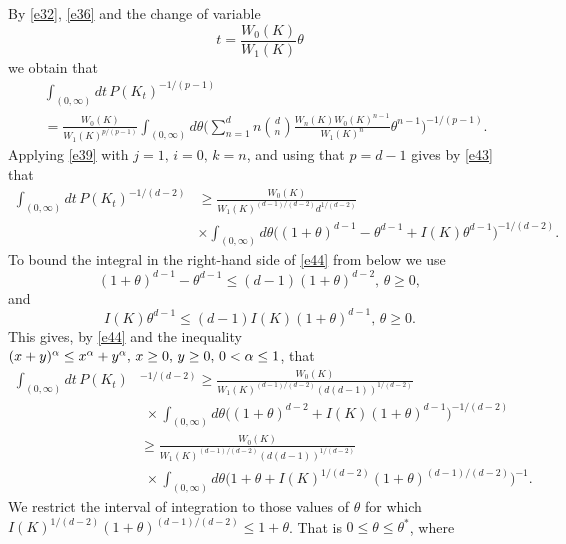 \documentclass[a4paper,9pt]{article}
\begin{document}
\medskip


 By \eqref{e32}, \eqref{e36} and the change of variable
\begin{equation*}%
t=\frac{W_0(K)}{W_1(K)}\theta
\end{equation*}
we obtain that
\begin{align}\label{e43}
&\int_{(0,\infty)}dt\, P(K_t)^{-1/(p-1)}\nonumber\\&=\frac{W_0(K)}{W_1(K)^{p/(p-1)}}\int_{(0,\infty)}d\theta \Big(\sum_{n=1}^d n\binom{d}{n} \frac{W_n(K)W_0(K)^{n-1}}{W_1(K)^n}\theta^{n-1}\Big)^{-1/(p-1)}.
\end{align}
Applying \eqref{e39} with $j=1,\,i=0,\,k=n$, and using that $p=d-1$ gives by \eqref{e43} that
\begin{align}\label{e44}
\int_{(0,\infty)}dt\, P(K_t)^{-1/(d-2)}&\ge\frac{W_0(K)}{W_1(K)^{(d-1)/(d-2)}d^{1/(d-2)}}\nonumber\\&\times\int_{(0,\infty)}d\theta \Big((1+\theta)^{d-1}-\theta^{d-1}+I(K)\theta^{d-1}\Big)^{-1/(d-2)}.
\end{align}
To bound the integral in the right-hand side of \eqref{e44} from below we use
\begin{equation*}%
(1+\theta)^{d-1}-\theta^{d-1}\le (d-1)(1+\theta)^{d-2},\,\theta\ge 0,
\end{equation*}
and
\begin{equation*}%
I(K)\theta^{d-1}\le (d-1)I(K)(1+\theta)^{d-1},\,\theta\ge 0.
\end{equation*}
This gives, by \eqref{e44} and the inequality $(x+y)^{\alpha}\le x^{\alpha}+y^{\alpha},\,x\ge 0,\,y\ge 0,\newline\,0<\alpha\le 1$, that
\begin{align}\label{e47}
\int_{(0,\infty)}dt\, P(K_t)&^{-1/(d-2)}\ge\frac{W_0(K)}{W_1(K)^{(d-1)/(d-2)}(d(d-1))^{1/(d-2)}}\nonumber\\&\,\,\times\int_{(0,\infty)}d\theta \Big((1+\theta)^{d-2}+I(K)(1+\theta)^{d-1}\Big)^{-1/(d-2)}\nonumber\\&
\ge \frac{W_0(K)}{W_1(K)^{(d-1)/(d-2)}(d(d-1))^{1/(d-2)}}\nonumber\\&\,\,\times\int_{(0,\infty)}d\theta \Big(1+\theta+I(K)^{1/(d-2)}(1+\theta)^{(d-1)/(d-2)}\Big)^{-1}.
\end{align}
We restrict the interval of integration to those values of $\theta$ for which \newline $I(K)^{1/(d-2)}(1+\theta)^{(d-1)/(d-2)}\le 1+\theta$. That is  $0\le\theta\le \theta^*$, where
\end{document}

